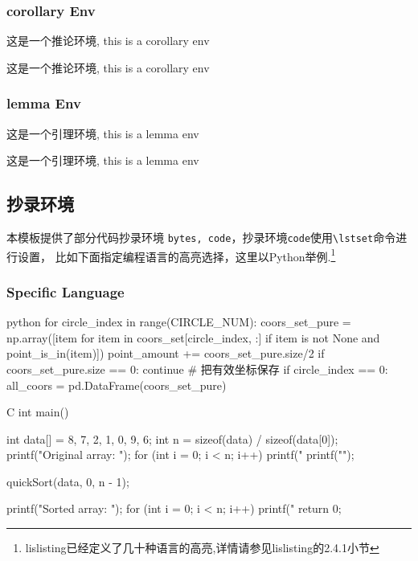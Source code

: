 \subsubsection{corollary Env}
\begin{bytes}[10]
\begin{corollary}[某推论]
    这是一个推论环境, this is a corollary env
\end{corollary}
\end{bytes}
\begin{corollary}[某推论]
    这是一个推论环境, this is a corollary env
\end{corollary}

\subsubsection{lemma Env}
\begin{bytes}[10]
\begin{lemma}[某引理]
    这是一个引理环境, this is a lemma env
\end{lemma}
\end{bytes}
\begin{lemma}[某引理]
    这是一个引理环境, this is a lemma env
\end{lemma}

\subsection{抄录环境}
本模板提供了部分代码抄录环境 \verb|bytes, code|，抄录环境\verb|code|使用\verb|\lstset|命令进行设置，
比如下面指定编程语言的高亮选择，这里以Python举例.\footnote[2]{lislisting已经定义了几十种语言的高亮,详情请参见lislisting的2.4.1小节}

\subsubsection{Specific Language}
\begin{code}{python}
for circle_index in range(CIRCLE_NUM):
    coors_set_pure = np.array([item for item in coors_set[circle_index, :] if item is not None and point_is_in(item)])
    point_amount += coors_set_pure.size/2
    if coors_set_pure.size == 0:
        continue
    # 把有效坐标保存
    if circle_index == 0:
        all_coors = pd.DataFrame(coors_set_pure)
\end{code}

\begin{code}{C}
int main() {
    int data[] = {8, 7, 2, 1, 0, 9, 6};
    int n = sizeof(data) / sizeof(data[0]);
    printf("Original array: \n");
    for (int i = 0; i < n; i++) {
        printf("%
    }
    printf("\n");
    
    quickSort(data, 0, n - 1);
    
    printf("Sorted array: \n");
    for (int i = 0; i < n; i++) {
        printf("%
    }
    return 0;
}    
\end{code}

